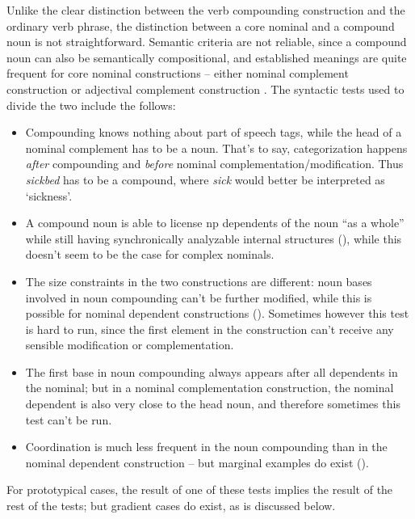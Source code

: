 \documentclass[UTF8, a4paper, oneside, scheme=plain, 12pt]{ctexbook}
\newcommand*{\citesec}[1]{\S~{#1}}
\newcommand*{\citechap}[1]{Ch.~{#1}}
\newcommand{\form}[1]{\emph{#1}}
\newcommand{\translate}[1]{`#1'}
\begin{document}
Unlike the clear distinction 
between the verb compounding construction 
and the ordinary verb phrase, 
the distinction between a core nominal 
and a compound noun is not straightforward. 
Semantic criteria are not reliable, 
since a compound noun can also be semantically compositional, 
and established meanings are quite frequent for core nominal constructions -- 
either nominal complement construction or adjectival complement construction 
\citep[\citechap{5}, \citesec{14.4}]{cgel}. 
The syntactic tests used to divide the two include the follows:
\begin{itemize}
    \item Compounding knows nothing about part of speech tags, 
    while the head of a nominal complement has to be a noun.
    That's to say, categorization happens \emph{after} compounding 
    and \form{before} nominal complementation/modification.
    Thus \form{sickbed} has to be a compound, 
    where \form{sick} would better be interpreted as \translate{sickness}. 
    \item A compound noun is able to license \acs{np} dependents of the noun
        ``as a whole'' while still having synchronically analyzable internal structures 
        (), 
        while this doesn't seem to be the case for 
        complex nominals. 

    \item The size constraints in the two constructions are different:
    noun bases involved in noun compounding 
    can't be further modified,
    while this is possible for nominal dependent constructions 
    (). 
    Sometimes however this test is hard to run, 
    since the first element in the construction can't receive any sensible modification 
    or complementation. 

    \item The first base in noun compounding 
        always appears after all dependents in the nominal; 
        but in a nominal complementation construction, 
        the nominal dependent is also very close to the head noun, 
        and therefore sometimes this test can't be run.

    \item Coordination is much less frequent in 
    the noun compounding than in the nominal dependent construction 
    -- but marginal examples do exist ().
\end{itemize}
For prototypical cases, the result of one of these tests 
implies the result of the rest of the tests; 
but gradient cases do exist, 
as is discussed below. 
\end{document}
